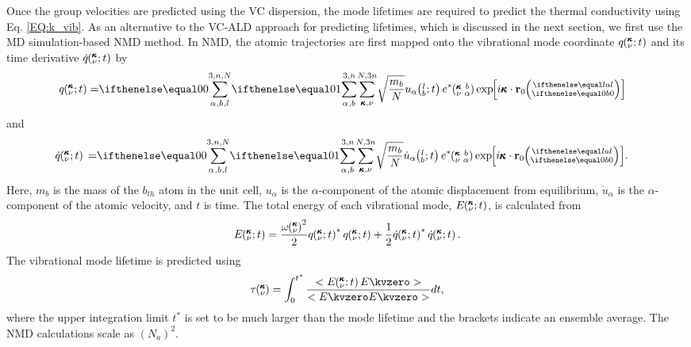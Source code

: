 Once the group velocities are predicted using the VC dispersion, 
the mode lifetimes are required to predict the thermal 
conductivity using Eq. \eqref{EQ:k_vib}. 
As an alternative to the VC-ALD approach for predicting lifetimes, 
which is discussed in the next section,  
we first use the MD simulation-based 
NMD method.\cite{ladd_lattice_1986,mcgaughey_quantitative_2004,turney_predicting_2009-1,larkin_comparison_2012} In NMD, the 
atomic trajectories are first mapped onto the vibrational 
mode coordinate $q\mspace{-4.0mu}\left(\mspace{-8.0mu} \begin{smallmatrix}&\pmb{\kappa} \\&\nu \end{smallmatrix}\mspace{-2.0mu};t\right)$ and its time derivative $\dot{q}\mspace{-4.0mu}\left(\mspace{-8.0mu} \begin{smallmatrix}&\pmb{\kappa} \\&\nu \end{smallmatrix}\mspace{-2.0mu};t\right)$ by
\cite{dove_introduction_1993}
\begin{equation}\label{EQ:q}
\begin{split}
q\kvt=&\SUM{0}{}\sqrt{\frac{m_b}{N}}u_{\alpha}\lbt e^*\kvba
\EXP{i\pmb{\kappa}\cdot\mathbf{r}_0\ab{l}{0}}
\end{split}
\end{equation}
and
\begin{equation}\label{EQ:qdot}
\begin{split}
\dot{q}\kvt{}{}{}=&\SUM{0}{}\sqrt{\frac{m_b}{N}}\dot{u}_{\alpha}
\lbt e^*\kvba\EXP{i\pmb{\kappa}\cdot\mathbf{r}_0\ab{l}{0}}.
\end{split}
\end{equation}
Here, $m_b$ is the mass of the $b_{th}$ atom in the unit cell, 
$u_{\alpha}$ is the $\alpha$-component of the atomic displacement 
from equilibrium, $\dot{u}_{\alpha}$ is the $\alpha$-component 
of the atomic velocity, and $t$ is time.    
The total energy of each vibrational mode, $E\mspace{-4.0mu}\left(\mspace{-8.0mu} \begin{smallmatrix}&\pmb{\kappa} \\&\nu \end{smallmatrix}\mspace{-2.0mu};t\right)$, is calculated 
from 
\begin{equation}\label{A:E}
\begin{split}
E\kvt = \frac{\omega\kv^2}{2} q\kvt^*q\kvt + 
\frac{1}{2}\dot{q}\kvt^*\dot{q}\kvt.
\end{split}
\end{equation}
The vibrational mode lifetime is predicted using 
\begin{equation}\label{EQ:tau_nmd}
\tau\kv = \int_{0}^{t^*}
\frac{<E\kvt E\kvzero>}{ <E\kvzero E\kvzero> }dt,
\end{equation}
where the upper integration limit $t^*$ is set to be much larger 
than the mode lifetime and the brackets indicate 
an ensemble average.\cite{larkin_comparison_2012} 
The NMD calculations scale 
as $(N_a)^2$.\cite{turney_predicting_2009}  

